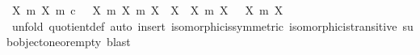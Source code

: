 \begin{isabellebody}
\ {\isachardoublequoteopen}{\isacharbraceleft}{\kern0pt}{\isacharparenleft}{\kern0pt}X{\isacharcomma}{\kern0pt}\ m{\isacharparenright}{\kern0pt}{\isachardot}{\kern0pt}\ {\isacharparenleft}{\kern0pt}X{\isacharcomma}{\kern0pt}\ m{\isacharparenright}{\kern0pt}\ {\isasymsubseteq}\isactrlsub c\ {\isasymone}{\isacharbraceright}{\kern0pt}\ {\isacharslash}{\kern0pt}{\isacharslash}{\kern0pt}\ {\isacharbraceleft}{\kern0pt}{\isacharparenleft}{\kern0pt}{\isacharparenleft}{\kern0pt}X{}{\isacharcomma}{\kern0pt}\ m{}{\isacharparenright}{\kern0pt}{\isacharcomma}{\kern0pt}\ {\isacharparenleft}{\kern0pt}X{}{\isacharcomma}{\kern0pt}\ m{}{\isacharparenright}{\kern0pt}{\isacharparenright}{\kern0pt}{\isachardot}{\kern0pt}\ X{}\ {\isasymcong}\ X{}{\isacharbraceright}{\kern0pt}\ {\isasymsubseteq}\ {\isacharbraceleft}{\kern0pt}{\isacharbraceleft}{\kern0pt}{\isacharparenleft}{\kern0pt}X{\isacharcomma}{\kern0pt}\ m{\isacharparenright}{\kern0pt}{\isachardot}{\kern0pt}\ X\ {\isasymcong}\ {\isasymemptyset}{\isacharbraceright}{\kern0pt}{\isacharcomma}{\kern0pt}\ {\isacharbraceleft}{\kern0pt}{\isacharparenleft}{\kern0pt}X{\isacharcomma}{\kern0pt}\ m{\isacharparenright}{\kern0pt}{\isachardot}{\kern0pt}\ X\ {\isasymcong}\ {\isasymone}{\isacharbraceright}{\kern0pt}{\isacharbraceright}{\kern0pt}{\isachardoublequoteclose}\isanewline
\ \ \ \ \ \ \isamarkupfalse%
\ {\isacharparenleft}{\kern0pt}unfold\ quotient{\isacharunderscore}{\kern0pt}def{\isacharcomma}{\kern0pt}\ auto{\isacharcomma}{\kern0pt}\ insert\ isomorphic{\isacharunderscore}{\kern0pt}is{\isacharunderscore}{\kern0pt}symmetric\ isomorphic{\isacharunderscore}{\kern0pt}is{\isacharunderscore}{\kern0pt}transitive\ subobject{\isacharunderscore}{\kern0pt}one{\isacharunderscore}{\kern0pt}or{\isacharunderscore}{\kern0pt}empty{\isacharcomma}{\kern0pt}\ blast{\isacharplus}{\kern0pt}{\isacharparenright}{\kern0pt}\isanewline
\ \ \isamarkupfalse%
\isanewline
\ \ \ \ \isamarkupfalse%

\end{isabellebody}
